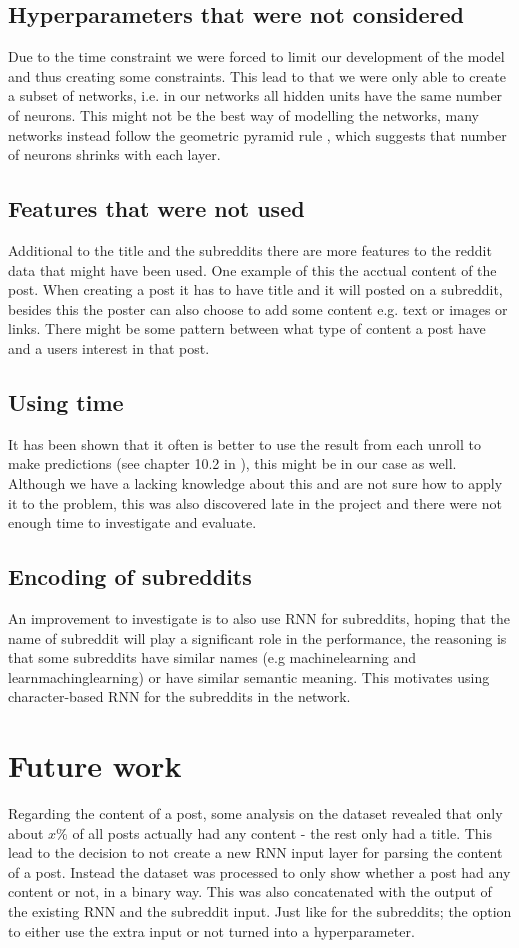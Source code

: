 \subsection{Hyperparameters that were not considered}
Due to the time constraint we were forced to limit our development of the model and thus creating some constraints. This lead to that we were only able to create a subset of networks, i.e. in our networks all hidden units have the same number of neurons. This might not be the best way of modelling the networks, many networks instead follow the geometric pyramid rule \parencite{masters1993practical}, which suggests that number of neurons shrinks with each layer.

\subsection{Features that were not used}
Additional to the title and the subreddits there are more features to the reddit data that might have been used. One example of this the acctual content of the post. When creating a post it has to have title and it will posted on a subreddit, besides this the poster can also choose to add some content e.g. text or images or links. There might be some pattern between what type of content a post have and a users interest in that post.
\subsection{Using time}
It has been shown that it often is better to use the result from each unroll to make predictions (see chapter 10.2 in \parencite{Goodfellow-et-al-2016}), this might be in our case as well. Although we have a lacking knowledge about this and are not sure how to apply it to the problem, this was also discovered late in the project and there were not enough time to investigate and evaluate.

\subsection{Encoding of subreddits}
An improvement to investigate is to also use RNN for subreddits, hoping that the name of subreddit will play a significant role in the performance, the reasoning is that some subreddits have similar names (e.g machinelearning and learnmachinglearning) or have similar semantic meaning. This motivates using character-based RNN for the subreddits in the network.

\section{Future work}
Regarding the content of a post, some analysis on the dataset revealed that only about $x\%$ of all posts actually had any content - the rest only had a title. This lead to the decision to not create a new RNN input layer for parsing the content of a post. Instead the dataset was processed to only show whether a post had any content or not, in a binary way. This was also concatenated with the output of the existing RNN and the subreddit input. Just like for the subreddits; the option to either use the extra input or not turned into a hyperparameter.